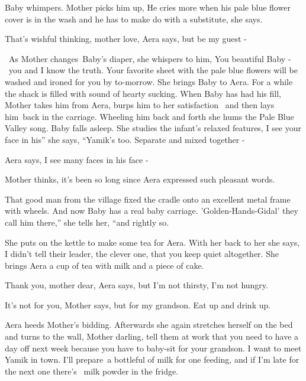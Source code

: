 \documentclass[12pt]{book}
\begin{document}
Baby whimpers. Mother picks him up, {\textquotedbl}He cries more when his pale blue flower cover is in the wash and he
has to make do with a substitute,{\textquotedbl} she says.

{\textquotedbl}That's wishful thinking, mother love,{\textquotedbl} Aera says, {\textquotedbl}but be my guest
-{\textquotedbl}

~As Mother changes~Baby's diaper, she whispers to him, {\textquotedbl}You beautiful Baby - ~you and I know the truth.
Your favorite sheet with the pale blue flowers will be washed and ironed for you by to-morrow.{\textquotedbl} She
brings Baby to Aera. For a while the shack is filled with sound of hearty sucking. When Baby has had his fill, Mother
takes him from Aera, burps him to her satisfaction \ and then lays him~back in the carriage. Wheeling him back and
forth she hums the Pale Blue Valley song. Baby falls asleep. She studies the infant's relaxed features,
{\textquotedbl}I see your face in his'' she says, ``Yamik's too. Separate and mixed together -{\textquotedbl}

Aera says, {\textquotedbl}I see many faces in his face -{\textquotedbl}~

Mother thinks, it's been so long since Aera expressed such{ }pleasant words.

{\textquotedbl}That good man from the village fixed the cradle onto{ }an excellent metal frame with
wheels. And now Baby has a real baby carriage. 'Golden-Hands-Gidal' they call him there,'' she tells her, ``and rightly
so.{\textquotedbl}

She puts on the kettle to make some tea for Aera. With her back to her she says, {\textquotedbl}I didn't tell their
leader, the clever one, that you keep quiet altogether.{\textquotedbl} She brings Aera a cup of tea with milk and a
piece of cake.

{\textquotedbl}Thank you, mother dear,{\textquotedbl} Aera says, {\textquotedbl}but I'm not thirsty, I'm not
hungry.{\textquotedbl}

{\textquotedbl}It's not for you,{\textquotedbl} Mother says, {\textquotedbl}but for my grandson. Eat up and drink
up.{\textquotedbl}

Aera heeds Mother's bidding. Afterwards she again stretches herself on the bed and turns to the wall,
{\textquotedbl}Mother darling, tell them at work that you need to have a day off next week because you have to baby-sit
for your grandson. I want to meet Yamik in town. I'll prepare~a bottleful of milk for one feeding, and if I'm late for
the next one there's ~milk powder in the fridge.{\textquotedbl}
\end{document}
